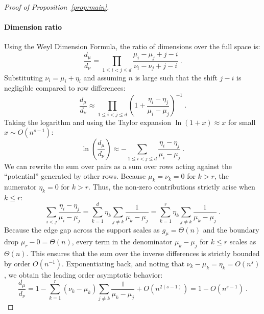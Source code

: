 \documentclass[11pt,letterpaper]{article}
\begin{document}
\begin{proof}[Proof of Proposition~\ref{prop:main}]
\paragraph{Dimension ratio}
Using the Weyl Dimension Formula, the ratio of dimensions over the full space is:
\begin{equation}
    \frac{d_\mu}{d_\nu} = \prod_{1 \le i < j \le d} \frac{\mu_i - \mu_j + j - i}{\nu_i - \nu_j + j - i} \ .
\end{equation}
Substituting $\nu_i = \mu_i + \eta_i$ and assuming $n$ is large such that the shift $j-i$ is negligible compared to row differences:
\begin{equation}
    \frac{d_\mu}{d_\nu} \approx \prod_{1 \le i < j \le d} \left( 1 + \frac{\eta_i - \eta_j}{\mu_i - \mu_j} \right)^{-1} \ .
\end{equation}
Taking the logarithm and using the Taylor expansion $\ln(1+x) \approx x$ for small $x \sim O(n^{s-1})$:
\begin{equation}
    \ln \left( \frac{d_\mu}{d_\nu} \right) \approx - \sum_{1 \le i < j \le d} \frac{\eta_i - \eta_j}{\mu_i - \mu_j} \ .
\end{equation}
We can rewrite the sum over pairs as a sum over rows acting against the ``potential'' generated by other rows. Because $\mu_k = \nu_k = 0$ for $k > r$, the numerator $\eta_k = 0$ for $k > r$. Thus, the non-zero contributions strictly arise when $k \le r$:
\begin{equation}
    \sum_{i < j} \frac{\eta_i - \eta_j}{\mu_i - \mu_j} = \sum_{k=1}^d \eta_k \sum_{j \neq k} \frac{1}{\mu_k - \mu_j} = \sum_{k=1}^r \eta_k \sum_{j \neq k} \frac{1}{\mu_k - \mu_j} \ .
\end{equation}
Because the edge gap across the support scales as $g_\mu = \Theta(n)$ and the boundary drop $\mu_r - 0 = \Theta(n)$, every term in the denominator $\mu_k - \mu_j$ for $k \le r$ scales as $\Theta(n)$. This ensures that the sum over the inverse differences is strictly bounded by order $O(n^{-1})$. Exponentiating back, and noting that $\nu_k - \mu_k = \eta_k = O(n^s)$, we obtain the leading order asymptotic behavior:
\begin{equation}
    \frac{d_\mu}{d_\nu} = 1 - \sum_{k=1}^r (\nu_k - \mu_k) \sum_{j \neq k} \frac{1}{\mu_k - \mu_j} + O(n^{2(s-1)})= 1-O(n^{s-1}) \ .
\end{equation}


\end{proof}
\end{document}
